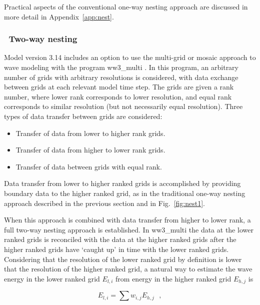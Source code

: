 Practical aspects of the conventional one-way nesting approach are
discussed in more detail in Appendix~\ref{app:nest}.


\vssub
\subsubsection{~Two-way nesting} \label{sub:two_way}
\vssub

Model version 3.14 includes an option to use the multi-grid or mosaic approach
to wave modeling with the program {\file ww3\_multi} \citep{tol:Vict06a,
  tol:MMAB07b, tol:OMOD08b}. In this program, an arbitrary number of grids
with arbitrary resolutions is considered, with data exchange between grids at
each relevant model time step. The grids are given a rank number, where lower
rank corresponds to lower resolution, and equal rank corresponds to similar
resolution (but not necessarily equal resolution).  Three types of data
transfer between grids are considered:

\begin{itemize}
\item Transfer of data from lower to higher rank grids.
\item Transfer of data from higher to lower rank grids.
\item Transfer of data between grids with equal rank.
\end{itemize}

Data transfer from lower to higher ranked grids is accomplished by providing
boundary data to the higher ranked grid, as in the traditional one-way nesting
approach described in the previous section and in Fig.~\ref{fig:nest1}.



When this approach is combined with data transfer from higher to lower rank, a
full two-way nesting approach is established. In {\file ww3\_multi} the data
at the lower ranked grids is reconciled with the data at the higher ranked
grids after the higher ranked grids have `caught up' in time with the lower
ranked grids.  Considering that the resolution of the lower ranked grid by
definition is lower that the resolution of the higher ranked grid, a natural
way to estimate the wave energy in the lower ranked grid $E_{l,i}$ from energy
in the higher ranked grid $E_{h,j}$ is

\begin{equation}
E_{l,i} = \sum w_{i,j} E_{h,j} \:\:\: , \label{eq:nest_hg1}
\end{equation}

